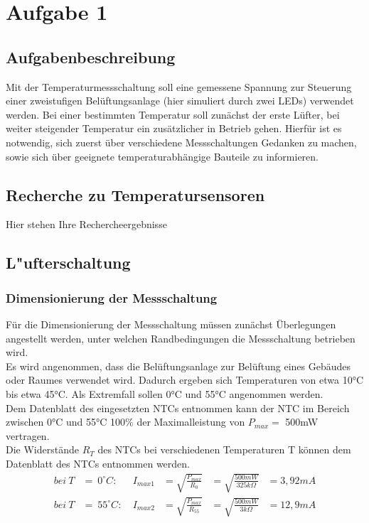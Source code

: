 \section{Aufgabe 1}

\subsection{Aufgabenbeschreibung}

Mit der Temperaturmessschaltung soll eine gemessene Spannung zur Steuerung einer zweistufigen Belüftungsanlage (hier simuliert durch zwei LEDs) verwendet werden. Bei einer bestimmten Temperatur soll zunächst der erste Lüfter, bei weiter steigender Temperatur ein zusätzlicher in Betrieb gehen. Hierfür ist es notwendig, sich zuerst über verschiedene Messschaltungen Gedanken zu machen, sowie sich über geeignete temperaturabhängige Bauteile zu informieren.

\subsection{Recherche zu Temperatursensoren}
Hier stehen Ihre Rechercheergebnisse

\subsection{L"ufterschaltung}

\subsubsection{Dimensionierung der Messschaltung}

Für die Dimensionierung der Messschaltung müssen zunächst Überlegungen angestellt werden, unter welchen Randbedingungen die Messschaltung betrieben wird.\\
Es wird angenommen, dass die Belüftungsanlage zur Belüftung eines Gebäudes oder Raumes verwendet wird. Dadurch ergeben sich Temperaturen von etwa 10°C bis etwa 45°C. Als Extremfall sollen 0°C und 55°C angenommen werden.\\
Dem Datenblatt des eingesetzten NTCs entnommen kann der NTC im Bereich zwischen 0°C und 55°C 100\% der Maximalleistung von \(P_{max} =\) 500mW vertragen.\\
Die Widerstände \(R_T\) des NTCs bei verschiedenen Temperaturen T können dem Datenblatt des NTCs entnommen werden.
\begin{align}
bei\ T&=\ 0^{\circ} C:\ &I_{max1} &= \sqrt{\frac{P_{max}}{R_0}} &= \sqrt{\frac{500mW}{325k\Omega}} &= 3,92mA\\
bei\ T&=\ 55^{\circ} C:\ &I_{max2} &= \sqrt{\frac{P_{max}}{R_{55}}} &= \sqrt{\frac{500mW}{3k\Omega}} &= 12,9mA 
\end{align}

